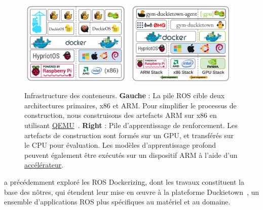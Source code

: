 \begin{figure}[ht]
\centering
\includegraphics[width=0.48\textwidth]{../figures/docker_stack_1.png}
\includegraphics[width=0.48\textwidth]{../figures/docker_stack_2.png}
\caption{Infrastructure des conteneurs. \textbf{Gauche} : La pile ROS cible deux architectures primaires, x86 et ARM. Pour simplifier le processus de construction, nous construisons des artefacts ARM sur x86 en utilisant \href{https://www.qemu.org}{QEMU}~\citep{bellard2005qemu}. \textbf{Right} : Pile d'apprentissage de renforcement. Les artefacts de construction sont formés sur un GPU, et transférés sur le CPU pour évaluation. Les modèles d'apprentissage profond peuvent également être exécutés sur un dispositif ARM à l'aide d'un \href{https://software.intel.com/en-us/neural-compute-stick}{accélérateur}.}
\label{fig:docker}
\end{figure}

\citet{white2017ros-docker} a précédemment exploré les ROS Dockerizing, dont les travaux constituent la base des nôtres, qui étendent leur mise en œuvre à la plateforme Duckietown~\citep{paull2017duckietown}, un ensemble d'applications ROS plus spécifiques au matériel et au domaine.


